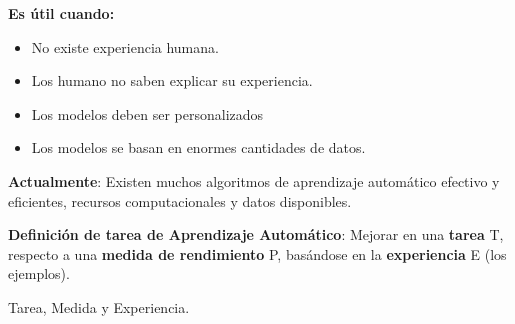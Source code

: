 \documentclass[12pt]{report} %
\begin{document}
\pagebreak

\textbf{Es útil cuando:}

\begin{itemize}
\item
  No existe experiencia humana.
\item
  Los humano no saben explicar su experiencia.
\item
  Los modelos deben ser personalizados
\item
  Los modelos se basan en enormes cantidades de datos.
\end{itemize}

\textbf{Actualmente}: Existen muchos algoritmos de aprendizaje
automático efectivo y eficientes, recursos computacionales y datos
disponibles.

\textbf{Definición de tarea de Aprendizaje Automático}: Mejorar en una
\textbf{tarea} T, respecto a una \textbf{medida de rendimiento} P,
basándose en la \textbf{experiencia} E (los ejemplos).

Tarea, Medida y Experiencia.
\end{document}
